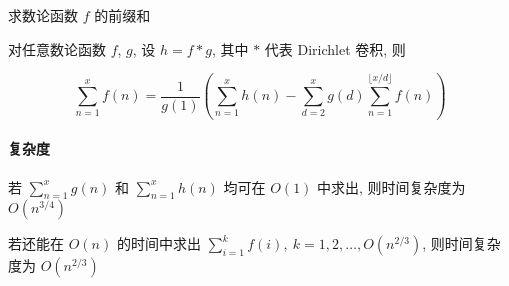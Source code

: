 求数论函数 \(f\) 的前缀和

对任意数论函数 \(f\), \(g\), 设 \(h=f*g\), 其中 \(*\) 代表 Dirichlet 卷积, 则

\[
    \sum_{n=1}^x f(n)=\frac{1}{g(1)} \left(\sum_{n=1}^x h(n)-\sum_{d=2}^xg(d)\sum_{n=1}^{\lfloor x/d\rfloor}f(n)\right)
\]

\paragraph{复杂度}

若 \(\sum_{n=1}^x g(n)\) 和 \(\sum_{n=1}^x h(n)\) 均可在 \(O(1)\) 中求出, 则时间复杂度为 \(O\left(n^{3/4}\right)\)

若还能在 \(O(n)\) 的时间中求出 \(\sum_{i=1}^k f(i),~k=1,2,\dots,O\left(n^{2/3}\right)\), 则时间复杂度为 \(O\left(n^{2/3}\right)\)
